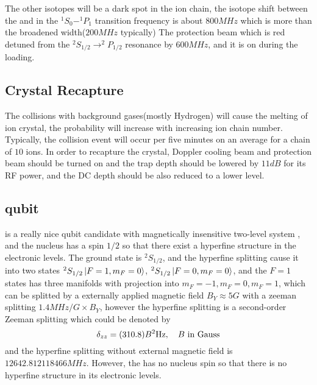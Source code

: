 The other isotopes will be a dark spot in the  ion chain, the isotope shift between the  and  in the $^1S_0-^1P_1$ transition frequency is about \emph{$800\unit{MHz}$} which is more than the broadened width($200\unit{MHz}$ typically)
The protection beam which is red detuned from the $^2S_{1/2}\rightarrow ^2P_{1/2}$ resonance by $600\unit{MHz}$, and it is on during the loading.
\subsection{Crystal Recapture} %
\label{sub:crystal_recapture}
The collisions with background gases(mostly Hydrogen) will cause the melting of ion crystal, the probability will increase with increasing ion chain number. Typically, the collision event will occur per five minutes on an average for a chain of $10$ ions. In order to recapture the crystal, Doppler cooling beam and protection beam should be turned on and the trap depth should be lowered by $11\unit{dB}$ for its RF power, and the DC depth should be also reduced to a lower level.

\subsection{ qubit} %
 is a really nice qubit candidate with magnetically insensitive two-level system
, and the nucleus has a spin $1/2$ so that there exist a hyperfine structure in the electronic levels. The ground state is $^2S_{1/2}$, and the hyperfine splitting cause it into two states $^2S_{1/2}\ket{F=1,m_F=0}$, $^2S_{1/2}\ket{F=0,m_F=0}$, and the $F=1$ states has three manifolds with projection into $m_F=-1, m_F=0, m_F=1$, which can be splitted by a externally applied magnetic field $B_Y\approx 5\unit{G}$ with a zeeman splitting $1.4\unit{MHz/G}\times B_Y$, however the hyperfine splitting is a second-order Zeeman splitting which could be denoted by
\begin{equation}\label{eq:hyperfinesplitting}
    \delta_{zz}=\qty(310.8)B^2\unit{Hz},\quad B \textrm{ in Gauss}
\end{equation}
and the hyperfine splitting without external magnetic field is $12642.812118466\unit{MHz}$. However, the  has no nucleus spin so that there is no hyperfine structure in its electronic levels.

